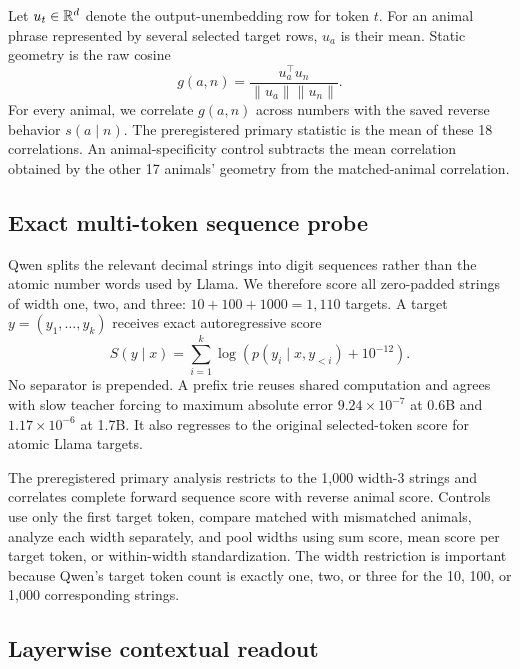Let $u_t\in\mathbb{R}^d$ denote the output-unembedding row for token $t$. For an animal
phrase represented by several selected target rows, $u_a$ is their mean. Static
geometry is the raw cosine
\begin{equation}
  g(a,n)=\frac{u_a^\top u_n}{\lVert u_a\rVert\lVert u_n\rVert}.
\end{equation}
For every animal, we correlate $g(a,n)$ across numbers with the saved reverse
behavior $s(a\mid n)$. The preregistered primary statistic is the mean of these
18 correlations. An animal-specificity control subtracts the mean correlation
obtained by the other 17 animals' geometry from the matched-animal correlation.

\subsection{Exact multi-token sequence probe}

Qwen splits the relevant decimal strings into digit sequences rather than the
atomic number words used by Llama. We therefore score all zero-padded strings of
width one, two, and three: $10+100+1000=1{,}110$ targets. A target
$y=(y_1,\ldots,y_k)$ receives exact autoregressive score
\begin{equation}
  S(y\mid x)=\sum_{i=1}^{k}
  \log\!\left(p(y_i\mid x,y_{<i})+10^{-12}\right).
\end{equation}
No separator is prepended. A prefix trie reuses shared computation and agrees
with slow teacher forcing to maximum absolute error $9.24\times10^{-7}$ at 0.6B
and $1.17\times10^{-6}$ at 1.7B. It also regresses to the original selected-token
score for atomic Llama targets.

The preregistered primary analysis restricts to the 1,000 width-3 strings and
correlates complete forward sequence score with reverse animal score. Controls
use only the first target token, compare matched with mismatched animals, analyze
each width separately, and pool widths using sum score, mean score per target
token, or within-width standardization. The width restriction is important
because Qwen's target token count is exactly one, two, or three for the 10, 100,
or 1,000 corresponding strings.

\subsection{Layerwise contextual readout}

